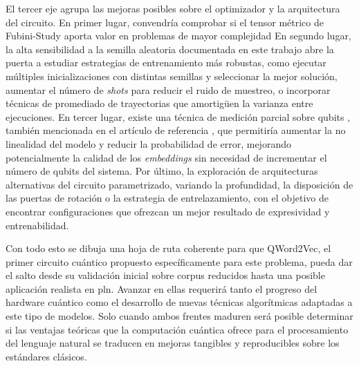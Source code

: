 El tercer eje agrupa las mejoras posibles sobre el optimizador y la arquitectura del circuito. En primer lugar, convendría comprobar si el tensor métrico de Fubini-Study aporta valor en problemas de mayor complejidad En segundo lugar, la alta sensibilidad a la semilla aleatoria documentada en este trabajo abre la puerta a estudiar estrategias de entrenamiento más robustas, como ejecutar múltiples inicializaciones con distintas semillas y seleccionar la mejor solución, aumentar el número de \textit{shots} para reducir el ruido de muestreo, o incorporar técnicas de promediado de trayectorias que amortigüen la varianza entre ejecuciones. En tercer lugar, existe una técnica de medición parcial sobre qubits \cite{huang_power_2021}, también mencionada en el artículo de referencia \cite{ohno_qword2vec_2025}, que permitiría aumentar la no linealidad del modelo y reducir la probabilidad de error, mejorando potencialmente la calidad de los \textit{embeddings} sin necesidad de incrementar el número de qubits del sistema. Por último, la exploración de arquitecturas alternativas del circuito parametrizado, variando la profundidad, la disposición de las puertas de rotación o la estrategia de entrelazamiento, con el objetivo de encontrar configuraciones que ofrezcan un mejor resultado de expresividad y entrenabilidad.

Con todo esto se dibuja una hoja de ruta coherente para que QWord2Vec, el primer circuito cuántico propuesto específicamente para este problema, pueda dar el salto desde su validación inicial sobre corpus reducidos hasta una posible aplicación realista en \gls{pln}. Avanzar en ellas requerirá tanto el progreso del hardware cuántico como el desarrollo de nuevas técnicas algorítmicas adaptadas a este tipo de modelos. Solo cuando ambos frentes maduren será posible determinar si las ventajas teóricas que la computación cuántica ofrece para el procesamiento del lenguaje natural se traducen en mejoras tangibles y reproducibles sobre los estándares clásicos.
